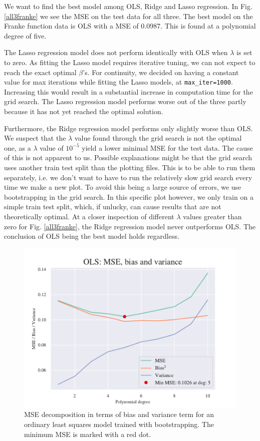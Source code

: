 We want to find the best model among OLS, Ridge and Lasso regression. 
In Fig. \ref{all3franke} we see the MSE on the test data for all three. 
The best model on the Franke function data is OLS with a MSE of 0.0987. 
This is found at a polynomial degree of five.  

The Lasso regression model does not perform identically with OLS when $\lambda$ is set to zero. 
As fitting the Lasso model requires iterative tuning, we can not expect to reach the exact optimal $\beta$'s. 
For continuity, we decided on having a constant value for max iterations while fitting the Lasso models, at \texttt{max\_iter=1000}. 
Increasing this would result in a substantial increase in computation time for the grid search.
The Lasso regression model performs worse out of the three partly because it has not yet reached the optimal solution.

Furthermore, the Ridge regression model performs only slightly worse than OLS.
We suspect that the $\lambda$ value found through the grid search is not the optimal one, as a $\lambda$ value of $10^{-5}$ yield a lower minimal MSE for the test data. 
The cause of this is not apparent to us. 
Possible explanations might be that the grid search uses another train test split than the plotting files. 
This is to be able to run them separately, i.e. we don't want to have to run the relatively slow grid search every time we make a new plot.
To avoid this being a large source of errors, we use bootstrapping in the grid search. 
In this specific plot however, we only train on a simple train test split, which, if unlucky, can cause results that are not theoretically optimal.
At a closer inspection of different $\lambda$ values greater than zero for Fig. \ref{all3franke}, the Ridge regression model never outperforms OLS. 
The conclusion of OLS being the best model holds regardless. 

\begin{figure}
    \centering
    \includegraphics[width=1\linewidth]{project_1/figures/figures_in_report/bias_var_Franke_Noise_bootstrap.pdf}
    \caption{MSE decomposition in terms of bias and variance term for an ordinary least squares model trained with bootstrapping. The minimum MSE is marked with a red dot. 
}
    \label{bias_var_trade}
\end{figure}

